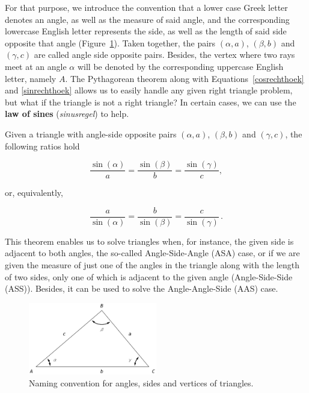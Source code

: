 For that purpose, we introduce the convention that a lower case Greek letter denotes an angle, as well as the measure of said angle,  and the corresponding lowercase English letter represents the side,  as well as the length of said side opposite that angle (Figure~\ref{fig_trans_19}).   Taken together, the pairs $(\alpha, a)$, $(\beta, b)$ and $(\gamma, c)$ are called angle side opposite pairs.  Besides, the vertex where two rays meet at an angle $\alpha$ will be denoted by the corresponding uppercase English letter, namely $A$. The Pythagorean theorem along with Equations~\eqref{cosrechthoek} and \eqref{sinrechthoek} allows us to easily handle any given right triangle problem, but what if the triangle is not a right triangle? In certain cases, we can use the \textbf{law of sines} (\textit{sinusregel}) to help.  




\begin{theorem}  \label{lawofsines}   Given a triangle with angle-side opposite pairs $(\alpha, a)$, $(\beta, b)$ and $(\gamma, c)$, the following ratios hold

\[ \frac{\sin(\alpha)}{a} = \frac{\sin(\beta)}{b} = \frac{\sin(\gamma)}{c},\]

or, equivalently,

\[ \frac{a}{\sin(\alpha)} = \frac{b}{\sin(\beta)}  = \frac{c}{\sin(\gamma)}\,. \]

\end{theorem}

This theorem enables us to solve triangles when, for instance, the given side is adjacent to both angles, the so-called Angle-Side-Angle (ASA) case, or if we are given the measure of just one of the angles in the triangle along with the length of two sides, only one of which is adjacent to the given angle (Angle-Side-Side (ASS)). Besides, it can be used to solve the Angle-Angle-Side (AAS) case. 

\begin{figure}[h]
	\begin{center}
			\includegraphics[width=0.5\textwidth]{fig_trans_19}
	\caption{Naming convention for angles, sides and vertices of triangles. }
	\label{fig_trans_19}
	\end{center}
\end{figure}

